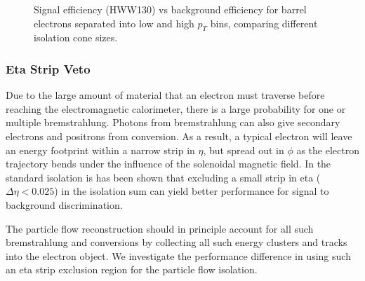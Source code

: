 \begin{figure}[!htbp]
\begin{center}
\caption{Signal efficiency (HWW130) vs background efficiency for barrel electrons separated into 
low and high $p_{T}$ bins, comparing different isolation cone sizes. }
\label{fig:IsoPerformance_Ele_PFIso_ConeSize}
\end{center}
\end{figure}


\subsubsection{Eta Strip Veto}

Due to the large amount of material that an electron must traverse before reaching the 
electromagnetic calorimeter, there is a large probability for one or multiple
bremstrahlung. Photons from bremstrahlung can also give secondary electrons and positrons
from conversion. As a result, a typical electron will leave an energy footprint within a 
narrow strip in $\eta$, but spread out in $\phi$ as the electron trajectory bends under
the influence of the solenoidal magnetic field. In the standard isolation is has been shown 
that excluding a small strip in eta ($\Delta\eta < 0.025$) in the isolation sum can yield 
better performance for signal to background discrimination. 

The particle flow reconstruction should in principle account for all such bremstrahlung 
and conversions by collecting all such energy clusters and tracks into the electron
object. We investigate the performance difference in using such an eta strip exclusion 
region for the particle flow isolation. 


